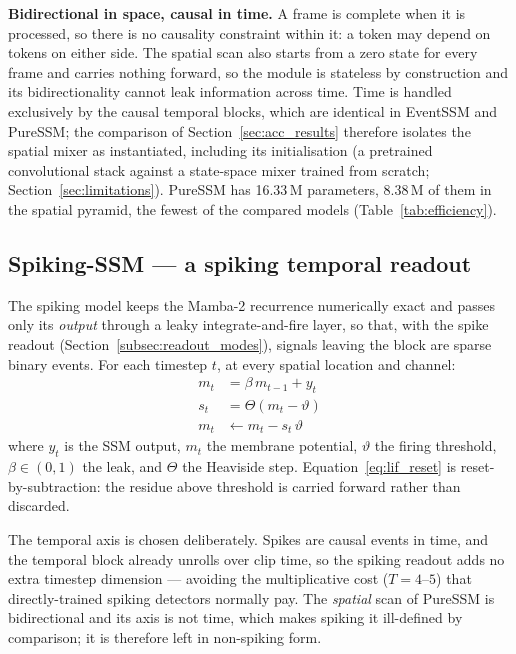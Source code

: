 \documentclass[11pt, a4paper]{report}
\begin{document}
\textbf{Bidirectional in space, causal in time.} A frame is complete when it is processed, so there is no
causality constraint within it: a token may depend on tokens on either side. The spatial scan also starts
from a zero state for every frame and carries nothing forward, so the module is stateless by construction
and its bidirectionality cannot leak information across time. Time is handled exclusively by the causal
temporal blocks, which are identical in EventSSM and PureSSM; the comparison of Section~\ref{sec:acc_results}
therefore isolates the spatial mixer as instantiated, including its initialisation (a pretrained
convolutional stack against a state-space mixer trained from scratch; Section~\ref{sec:limitations}). PureSSM has 16.33\,M parameters, 8.38\,M of them in the spatial
pyramid, the fewest of the compared models (Table~\ref{tab:efficiency}).

\subsection{Spiking-SSM --- a spiking temporal readout}
\label{subsec:spiking_method}
The spiking model keeps the Mamba-2 recurrence numerically exact and passes only its \emph{output}
through a leaky integrate-and-fire layer, so that, with the spike readout
(Section~\ref{subsec:readout_modes}), signals leaving the block are sparse binary events.
For each timestep $t$, at every spatial location and channel:
\begin{align}
  m_t &= \beta\, m_{t-1} + y_t \label{eq:lif_integrate}\\
  s_t &= \Theta(m_t - \vartheta) \label{eq:lif_fire}\\
  m_t &\leftarrow m_t - s_t\,\vartheta \label{eq:lif_reset}
\end{align}
where $y_t$ is the SSM output, $m_t$ the membrane potential, $\vartheta$ the firing threshold,
$\beta \in (0,1)$ the leak, and $\Theta$ the Heaviside step. Equation~\eqref{eq:lif_reset} is
reset-by-subtraction: the residue above threshold is carried forward rather than discarded.

The temporal axis is chosen deliberately. Spikes are causal events in time, and the temporal block
already unrolls over clip time, so the spiking readout adds no extra timestep dimension --- avoiding
the multiplicative cost ($T=4$--$5$) that directly-trained spiking detectors normally pay. The
\emph{spatial} scan of PureSSM is bidirectional and its axis is not time, which makes spiking it
ill-defined by comparison; it is therefore left in non-spiking form.
\end{document}
